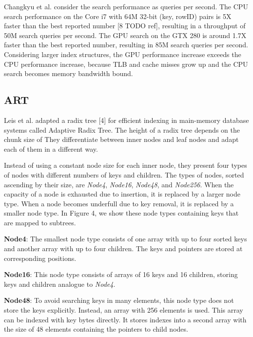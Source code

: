 \documentclass[conference]{IEEEtran}
\begin{document}
Changkyu et al. consider the search performance as queries per second. The CPU search performance on the Core i7 with 64M 32-bit (key, rowID) pairs is 5X faster than the best reported number [8 TODO ref], resulting in a throughput of 50M search queries per second. The GPU search on the GTX 280 is around 1.7X faster than the best reported number, resulting in 85M search queries per second. Considering larger index structures, the GPU performance increase exceeds the CPU performance increase, because TLB and cache misses grow up and the CPU search becomes memory bandwidth bound.


\subsection{ART}\label{SCM}
Leis et al. adapted a radix tree [4] for efficient indexing in main-memory database systems called Adaptive Radix Tree. The height of a radix tree depends on the chunk size of They differentiate between inner nodes and leaf nodes and adapt each of them in a different way. 

Instead of using a constant node size for each inner node, they present four types of nodes with different numbers of keys and children. The types of nodes, sorted ascending by their size, are \emph{Node4}, \emph{Node16}, \emph{Node48}, and \emph{Node256}. When the capacity of a node is exhausted due to insertion, it is replaced by a larger node type. When a node becomes underfull due to key removal, it is replaced by a smaller node type. In Figure 4, we show these node types containing keys that are mapped to subtrees.

\textbf{Node4}: The smallest node type consists of one array with up to four sorted keys and another array with up to four children. The keys and pointers are stored at corresponding positions.

\textbf{Node16}: This node type consists of arrays of 16 keys and 16 children, storing keys and children analogue to \emph{Node4}.

\textbf{Node48}: To avoid searching keys in many elements, this node type does not store the keys explicitly. Instead, an array with 256 elements is used. This array can be indexed with key bytes directly. It stores indexes into a second array with the size of 48 elements containing the pointers to child nodes.
\end{document}
